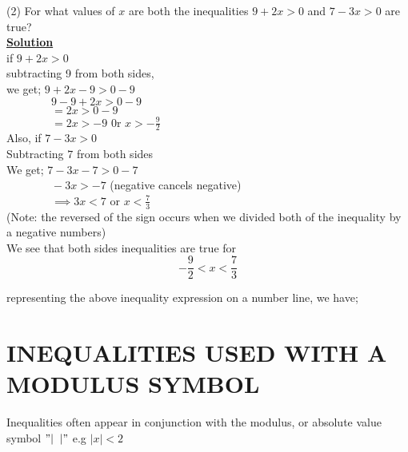 \documentclass[12pt]{report}
\newcommand{\ubt}[1]{\textbf{\underline{#1}}}
\newcommand{\NI}{\noindent}
\newcommand{\dsp}{\displaystyle}
\begin{document}
	\NI(2) For what values of $x$ are both the inequalities $9+2x >0$ and $7-3x>0$ are true?\\
	\ubt{Solution}\\
	if $9 + 2x>0$\\
	subtracting 9 from both sides,\\
	we get; \quad $9+2x-9>0-9$\\
	$\left.\right.\qquad\qquad 9-9 + 2x > 0-9$\\
	$\left.\right.\qquad\qquad = 2x > 0-9$\\
	$\left.\right.\qquad\qquad = 2x > -9$ 0r $\dsp x> -\frac{9}{2}$\\
	
	\NI Also, if $7-3x > 0$\\
	Subtracting $7$ from both sides\\
	We get; \quad $7-3x-7> 0 -7$\\
	$\left.\right.\qquad\qquad -3x > -7$ (negative cancels negative)\\
	$\left.\right.\qquad\qquad \implies 3x < 7$ or $\dsp x < \frac{7}{3}$\\
	
	\NI (Note: the reversed of the sign occurs when we divided both of the inequality by a negative numbers)\\
	We see that both sides inequalities are true for\\
	$$-\frac{9}{2} < x < \frac{7}{3}$$

	\NI representing the above inequality expression on a number line, we have;\\
	\begin{center}
	\end{center}
	
	\section{INEQUALITIES USED WITH A MODULUS SYMBOL}
	Inequalities often appear in conjunction with the modulus, or absolute value symbol $"|\;\;|"$ e.g $|x|<2$\\
	
\end{document}
